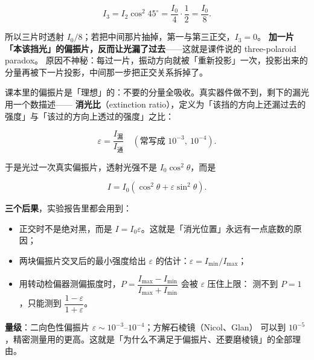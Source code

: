 \documentclass[11pt]{ctexart}
\let\subhdrtheme\subhdr
\renewcommand{\subhdr}[1]{\needspace{4\baselineskip}\subhdrtheme{#1}}
\begin{document}
\[
I_3=I_2\cos^2 45^\circ=\frac{I_0}{4}\cdot\frac12=\frac{I_0}{8}.
\]

所以三片时透射 $I_0/8$；若把中间那片抽掉，第一与第三正交，$I_3=0$。
\textbf{加一片「本该挡光」的偏振片，反而让光漏了过去}——这就是课件说的 three-polaroid paradox。
原因不神秘：每过一片，振动方向就被「重新投影」一次，投影出来的分量再被下一片投影，中间那一步把正交关系拆掉了。


课本里的偏振片是「理想」的：不要的分量全吸收。真实器件做不到，剩下的漏光用一个数描述——
\textbf{消光比}（extinction ratio），定义为「该挡的方向上还漏过去的强度」与「该过的方向上透过的强度」之比：

\[
\varepsilon=\frac{I_{\text{漏}}}{I_{\text{通}}}\quad(\text{常写成 }10^{-3},\ 10^{-4}).
\]

于是光过一次真实偏振片，透射光强不是 $I_0\cos^2\theta$，而是

\[
I=I_0\left(\cos^2\theta+\varepsilon\sin^2\theta\right).
\]

\textbf{三个后果}，实验报告里都会用到：

\begin{itemize}[leftmargin=1.8em]
\item 正交时不是绝对黑，而是 $I=I_0\varepsilon$。这就是「消光位置」永远有一点底数的原因；
\item 两块偏振片交叉后的最小强度给出 $\varepsilon$ 的估计：$\varepsilon=I_{\min}/I_{\max}$；
\item 用转动检偏器测偏振度时，$P=\dfrac{I_{\max}-I_{\min}}{I_{\max}+I_{\min}}$ 会被 $\varepsilon$ 压住上限：
测不到 $P=1$，只能测到 $\dfrac{1-\varepsilon}{1+\varepsilon}$。
\end{itemize}

\textbf{量级}：二向色性偏振片 $\varepsilon\sim10^{-3}$--$10^{-4}$；方解石棱镜（Nicol、Glan）
可以到 $10^{-5}$，精密测量用的更高。这就是「为什么不满足于偏振片、还要磨棱镜」的全部理由。


\end{document}
